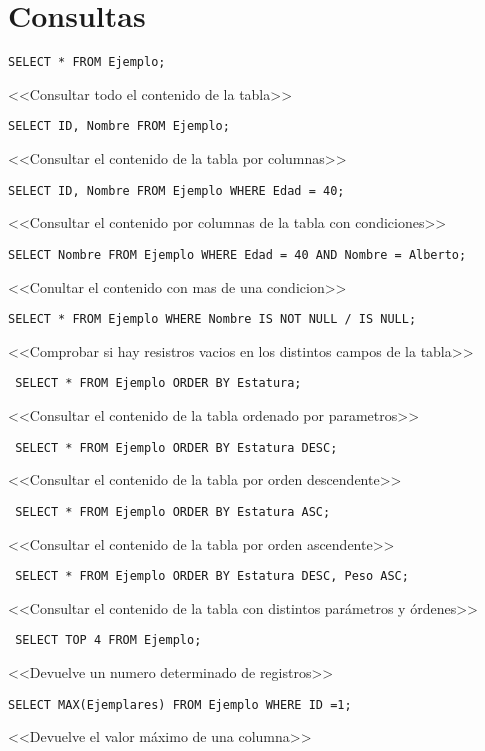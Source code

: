 \documentclass[a4paper, 11pt, titlepage]{article}
\begin{document}
\section*{Consultas}
\begin{verbatim}
SELECT * FROM Ejemplo;
\end{verbatim}
<<Consultar todo el contenido de la tabla>> 
\begin{verbatim}
SELECT ID, Nombre FROM Ejemplo; 
\end{verbatim}
<<Consultar el contenido de la tabla por columnas>> 
\begin{verbatim}
SELECT ID, Nombre FROM Ejemplo WHERE Edad = 40;
\end{verbatim}
<<Consultar el contenido por columnas de la tabla con condiciones>> 
\begin{verbatim}
SELECT Nombre FROM Ejemplo WHERE Edad = 40 AND Nombre = Alberto; 
\end{verbatim}
<<Conultar el contenido con mas de una condicion>> 
\begin{verbatim}
SELECT * FROM Ejemplo WHERE Nombre IS NOT NULL / IS NULL;
\end{verbatim}
<<Comprobar si hay resistros vacios en los distintos campos de la tabla>> 
\begin{verbatim}
 SELECT * FROM Ejemplo ORDER BY Estatura;
\end{verbatim}
 <<Consultar el contenido de la tabla ordenado por parametros>> 
\begin{verbatim}
 SELECT * FROM Ejemplo ORDER BY Estatura DESC;
\end{verbatim}
 <<Consultar el contenido de la tabla por orden descendente>> 
\begin{verbatim}
 SELECT * FROM Ejemplo ORDER BY Estatura ASC;
\end{verbatim}
 <<Consultar el contenido de la tabla por orden ascendente>> 
 \begin{verbatim}
 SELECT * FROM Ejemplo ORDER BY Estatura DESC, Peso ASC; \end{verbatim}
 <<Consultar el contenido de la tabla con distintos parámetros y órdenes>> 
 \begin{verbatim}
 SELECT TOP 4 FROM Ejemplo;
\end{verbatim}
 <<Devuelve un numero determinado de registros>> 
\begin{verbatim} 
SELECT MAX(Ejemplares) FROM Ejemplo WHERE ID =1;
\end{verbatim}
<<Devuelve el valor máximo de una columna>> 
\end{document}
